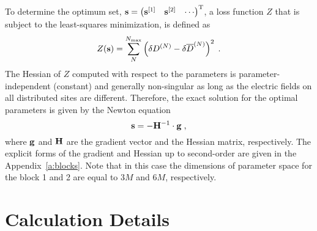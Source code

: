 \documentclass[aip,jcp,preprint,amsmath,amssymb,floatfix]{revtex4-1}
\begin{document}
To determine the optimum set,
$
 {\bf s} = 
\begin{pmatrix}
{\bf s}^{[1]} &
{\bf s}^{[2]} & \cdots
\end{pmatrix}^{\rm T}
$, a loss function $Z$ 
that is subject to the least\hyp{}squares minimization, is defined as
%
\begin{equation}\label{e:Z}
 Z({\bf s}) = \sum_N^{N_{\rm max}} \left( \delta D^{(N)} - \delta \overline{D}^{(N)} \right)^2 \;.
\end{equation}
%
The Hessian of $Z$ computed with respect to the parameters 
is parameter\hyp{}independent (constant) and generally non\hyp{}singular
as long as the electric fields on all distributed sites are different.
Therefore, the exact solution for the optimal parameters is given by the Newton equation
%
\begin{equation}\label{e:Newton}
 {\bf s} = -{\bf H}^{-1} \cdot {\bf g} \;,
\end{equation}
%
where ${\bf g}$ and ${\bf H}$ are the gradient vector and the Hessian matrix, respectively.
The explicit forms of the gradient and Hessian up to second\hyp{}order 
are given in the Appendix~\ref{a:blocks}.
Note that in this case the dimensions of parameter space for the block 1 and 2 are
equal to $3M$ and $6M$, respectively.

\section{\label{s:3}Calculation Details}
\end{document}
